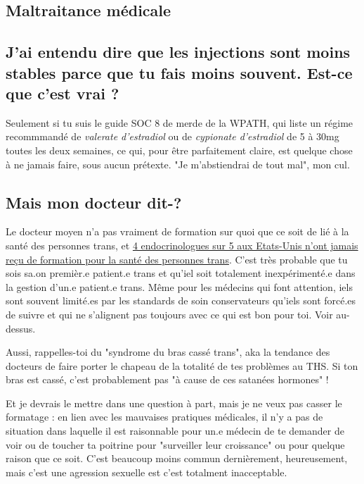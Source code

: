 \documentclass{article}
\begin{document}
\subsection*{Maltraitance médicale}

\subsection{J'ai entendu dire que les injections sont moins stables parce que tu fais moins souvent. Est-ce que c'est vrai ?}

Seulement si tu suis le guide SOC 8 de merde de la WPATH, qui liste un régime recommmandé de \textit{valerate d'estradiol} ou de \textit{cypionate d'estradiol} de 5 à 30mg toutes les deux semaines, ce qui, pour être parfaitement claire, est quelque chose à ne jamais faire, sous aucun prétexte. "Je m'abstiendrai de tout mal", mon cul.

\subsection{Mais mon docteur dit-?}

Le docteur moyen n'a pas vraiment de formation sur quoi que ce soit de lié à la santé des personnes trans, et \href{https://www.endocrine.org/news-and-advocacy/news-room/2017/endocrinologists-want-training-in-transgender-care }{4 endocrinologues sur 5 aux Etats-Unis n'ont jamais reçu de formation pour la santé des personnes trans}. C'est très probable que tu sois sa.on premièr.e patient.e trans et qu'iel soit totalement inexpérimenté.e dans la gestion d'un.e patient.e trans. Même pour les médecins qui font attention, iels sont souvent limité.es par les standards de soin conservateurs qu'iels sont forcé.es de suivre et qui ne s'alignent pas toujours avec ce qui est bon pour toi. Voir au-dessus.

Aussi, rappelles-toi du "syndrome du bras cassé trans", aka la tendance des docteurs de faire porter le chapeau de la totalité de tes problèmes au THS. Si ton bras est cassé, c'est probablement pas "à cause de ces satanées hormones" ! 

Et je devrais le mettre dans une question à part, mais je ne veux pas casser le formatage : en lien avec les mauvaises pratiques médicales, il n'y a pas de situation dans laquelle il est raisonnable pour un.e médecin de te demander de voir ou de toucher ta poitrine pour "surveiller leur croissance" ou pour quelque raison que ce soit. C'est beaucoup moins commun dernièrement, heureusement, mais c'est une agression sexuelle est c'est totalment inacceptable.
\end{document}
